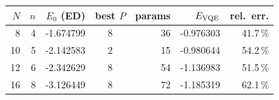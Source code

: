 \begin{tabular}{r r r c r r r}
\toprule
$N$ & $n$ & $E_0$ (ED) & best $P$ & params & $E_{\rm VQE}$ & rel.\ err. \\
\midrule
8 & 4 & -1.674799 & 8 & 36 & -0.976303 & 41.7\,\% \\
10 & 5 & -2.142583 & 2 & 15 & -0.980644 & 54.2\,\% \\
12 & 6 & -2.342629 & 8 & 54 & -1.136983 & 51.5\,\% \\
16 & 8 & -3.126449 & 8 & 72 & -1.185319 & 62.1\,\% \\
\bottomrule
\end{tabular}
